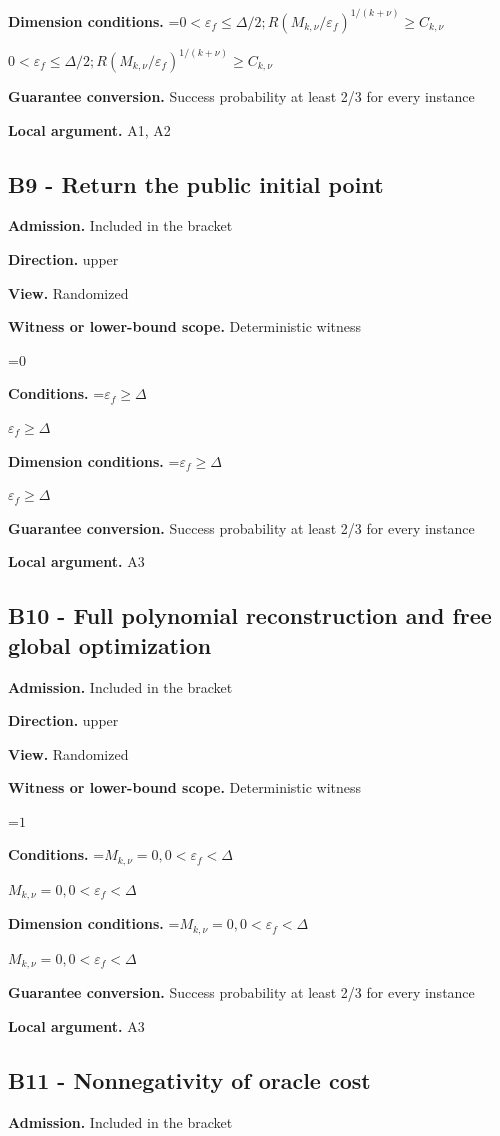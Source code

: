 \documentclass[10pt,a4paper]{article}
\newcommand{\AtlasMath}[1]{\par\begingroup\centering\setbox0=\hbox{$\displaystyle #1$}\ifdim\wd0>1.4\linewidth\typeout{ATLAS WIDE FORMULA: \the\wd0}\fi\ifdim\wd0>\linewidth\resizebox{\linewidth}{!}{\box0}\else\box0\fi\par\endgroup}
\newcommand{\AtlasInlineMath}[1]{\begingroup\setbox0=\hbox{$#1$}\ifdim\wd0>.4\linewidth\endgroup\AtlasMath{#1}\else\endgroup$#1$\fi}
\begin{document}
\textbf{Dimension conditions.} \AtlasInlineMath{0<\varepsilon_f\le \Delta/2;R(M_{k,\nu}/\varepsilon_f)^{1/(k+\nu)}\ge C_{k,\nu}}

\textbf{Guarantee conversion.} Success probability at least 2/3 for every instance

\textbf{Local argument.} A1, A2

\subsection{B9 - Return the public initial point}
\textbf{Admission.} Included in the bracket

\textbf{Direction.} upper

\textbf{View.} Randomized

\textbf{Witness or lower-bound scope.} Deterministic witness

\AtlasMath{0}
\textbf{Conditions.} \AtlasInlineMath{\varepsilon_f\ge \Delta}

\textbf{Dimension conditions.} \AtlasInlineMath{\varepsilon_f\ge \Delta}

\textbf{Guarantee conversion.} Success probability at least 2/3 for every instance

\textbf{Local argument.} A3

\subsection{B10 - Full polynomial reconstruction and free global optimization}
\textbf{Admission.} Included in the bracket

\textbf{Direction.} upper

\textbf{View.} Randomized

\textbf{Witness or lower-bound scope.} Deterministic witness

\AtlasMath{1}
\textbf{Conditions.} \AtlasInlineMath{M_{k,\nu}=0,0<\varepsilon_f<\Delta}

\textbf{Dimension conditions.} \AtlasInlineMath{M_{k,\nu}=0,0<\varepsilon_f<\Delta}

\textbf{Guarantee conversion.} Success probability at least 2/3 for every instance

\textbf{Local argument.} A3

\subsection{B11 - Nonnegativity of oracle cost}
\textbf{Admission.} Included in the bracket
\end{document}
